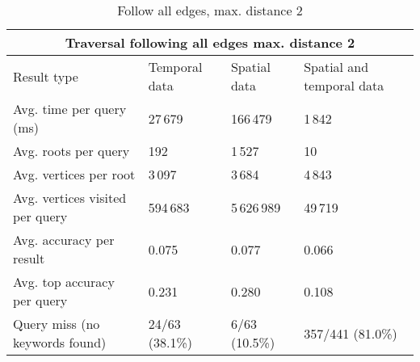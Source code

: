 \begin{table}[h]
	\caption{Follow all edges, max. distance 2}
	\label{table:followAll2}
	\begin{tabular}{ |p{3cm}||p{3cm}|p{3cm}|p{3cm}|  }
		\hline
		\multicolumn{4}{|c|}{Traversal following all edges max. distance 2}                         \\
		\hline
		Result type                    & Temporal data  & Spatial data  & Spatial and temporal data	\\
		\hline
		Avg. time per query (ms)       & 27\,679        & 166\,479      & 1\,842                    \\
		Avg. roots per query           & 192            & 1\,527        & 10                        \\
		Avg. vertices per root            & 3\,097         & 3\,684        & 4\,843                    \\
		Avg. vertices visited per query   & 594\,683       & 5\,626\,989   & 49\,719                   \\
		Avg. accuracy per result       & 0.075          & 0.077         & 0.066                     \\
		Avg. top accuracy per query    & 0.231          & 0.280         & 0.108                     \\
		Query miss (no keywords found) & 24/63 (38.1\%) & 6/63 (10.5\%) & 357/441 (81.0\%)          \\
		\hline
	\end{tabular}
\end{table}